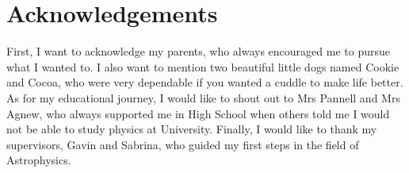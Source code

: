 \chapter{Acknowledgements}

First, I want to acknowledge my parents, who always encouraged me to pursue what I wanted to. I also want to mention two beautiful little dogs named Cookie and Cocoa, who were very dependable if you wanted a cuddle to make life better. As for my educational journey, I would like to shout out to Mrs Pannell and Mrs Agnew, who always supported me in High School when others told me I would not be able to study physics at University. Finally, I would like to thank my supervisors, Gavin and Sabrina, who guided my first steps in the field of Astrophysics.